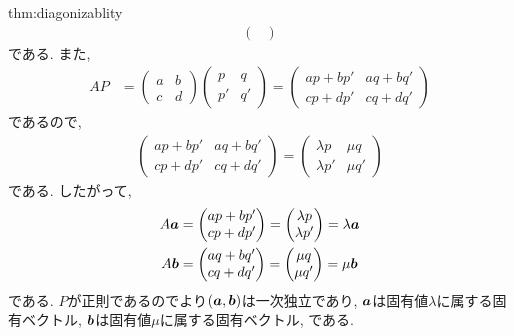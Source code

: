 \begin{proofof}{thm:diagonizablity}
\begin{align*}
\begin{pmatrix}
    \end{pmatrix}
  \end{align*}
  である.
  また,
  \begin{align*}
    AP&=
    \begin{pmatrix}
      a &b\\c&d
    \end{pmatrix}
    \begin{pmatrix}
      p&q\\p'&q'
    \end{pmatrix}=
    \begin{pmatrix}
      ap+bp' &aq+bq'\\cp+dp'&cq+dq'
    \end{pmatrix}
  \end{align*}
  であるので,
  \begin{align*}
    \begin{pmatrix}
      ap+bp' &aq+bq'\\cp+dp'&cq+dq'
    \end{pmatrix}
    =
    \begin{pmatrix}
      \lambda p&\mu q\\ \lambda p'&\mu q'
    \end{pmatrix}
  \end{align*}
  である.
  したがって,
  \begin{align*}
    A\boldsymbol{a}&=
        \begin{pmatrix}
      ap+bp' \\cp+dp'
    \end{pmatrix}
    =
    \begin{pmatrix}
      \lambda p\\ \lambda p'
    \end{pmatrix}
    =
    \lambda \boldsymbol{a}\\
    A\boldsymbol{b}&=
    \begin{pmatrix}
      aq+bq'\\cq+dq'
    \end{pmatrix}
    =
    \begin{pmatrix}
      \mu q\\\mu q'
    \end{pmatrix}
    =
    \mu \boldsymbol{b}
  \end{align*}
  である.
  $P$が正則であるのでより$(\boldsymbol{a},\boldsymbol{b})$は一次独立であり,
  $\boldsymbol{a}$は固有値$\lambda$に属する固有ベクトル,
  $\boldsymbol{b}$は固有値$\mu$に属する固有ベクトル,
  である.
  

\end{proofof}
